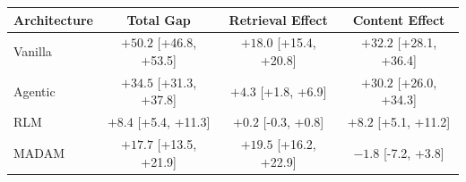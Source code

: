 \begin{tabular}{@{}lccc@{}}
\toprule
\textbf{Architecture} & \textbf{Total Gap} & \textbf{Retrieval Effect} & \textbf{Content Effect} \\
\midrule
Vanilla & $+50.2$ [+46.8, +53.5] & $+18.0$ [+15.4, +20.8] & $+32.2$ [+28.1, +36.4] \\
Agentic & $+34.5$ [+31.3, +37.8] & $+4.3$ [+1.8, +6.9] & $+30.2$ [+26.0, +34.3] \\
RLM & $+8.4$ [+5.4, +11.3] & $+0.2$ [-0.3, +0.8] & $+8.2$ [+5.1, +11.2] \\
MADAM & $+17.7$ [+13.5, +21.9] & $+19.5$ [+16.2, +22.9] & $-1.8$ [-7.2, +3.8] \\
\bottomrule
\end{tabular}